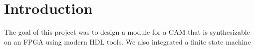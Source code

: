 \section{Introduction}
The goal of this project was to design a module for a CAM that is synthesizable on an FPGA using modern HDL tools. 
We also integrated a finite state machine 